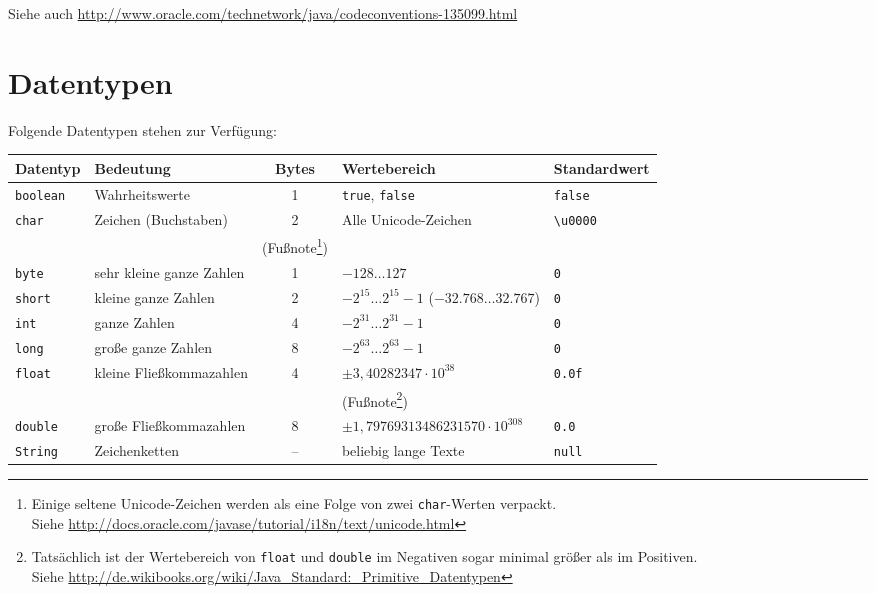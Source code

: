 Siehe auch
\url{http://www.oracle.com/technetwork/java/codeconventions-135099.html}


\section{Datentypen}

Folgende Datentypen stehen zur Verfügung:

\begin{savenotes}
\begin{tabularx}{\textwidth}{|l|X|c|l|l|}\hline
\textbf{Datentyp} & \textbf{Bedeutung} & \textbf{Bytes} &
\textbf{Wertebereich} & \textbf{Standardwert}
\\ \hline
\texttt{boolean} & Wahrheitswerte & 1 & \texttt{true},
\texttt{false} & \texttt{false}
\\ \hline
\texttt{char} & Zeichen (Buchstaben) & 2 & Alle Unicode-Zeichen &
\texttt{\textbackslash u0000}
\\
&&(Fußnote\footnote{Einige seltene Unicode-Zeichen werden als eine Folge von
zwei \texttt{char}-Werten verpackt.\\ Siehe
\url{http://docs.oracle.com/javase/tutorial/i18n/text/unicode.html}})&&
\\
\hline \texttt{byte} & sehr kleine ganze Zahlen & 1 & $-128 \dots 127$ & \texttt{0}
\\ \hline
\texttt{short} & kleine ganze Zahlen & 2 & $-2^{15} \dots 2^{15}-1$
($-32.768 \dots 32.767$) & \texttt{0} \\ \hline
\texttt{int} & ganze Zahlen & 4 & $-2^{31} \dots 2^{31}-1$ & \texttt{0}
\\ \hline 
\texttt{long} & große ganze Zahlen & 8 & $-2^{63} \dots 2^{63}-1$ & \texttt{0}
\\ \hline
\texttt{float} & kleine Fließkommazahlen & 4 & $\pm 3{,}40282347 \cdot
10^{38}$ & \texttt{0.0f} \\ 
&&& (Fußnote\footnote{Tatsächlich ist der Wertebereich von \texttt{float} und
\texttt{double} im Negativen sogar minimal größer als im Positiven.\\ Siehe
\url{http://de.wikibooks.org/wiki/Java_Standard:_Primitive_Datentypen}})&
\\
\hline \texttt{double} & große Fließkommazahlen & 8 & $\pm 1{,}79769313486231570
\cdot 10^{308}$ & \texttt{0.0}
\\ \hline
\texttt{String} & Zeichenketten & -- & beliebig lange Texte & \texttt{null}
\\ \hline
\end{tabularx}
\end{savenotes}


